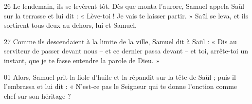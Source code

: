 
26 Le lendemain, ils se levèrent tôt. Dès que monta l’aurore, Samuel appela Saül sur la terrasse et lui dit : « Lève-toi ! Je vais te laisser partir. » Saül se leva, et ils sortirent tous deux au-dehors, lui et Samuel.

27 Comme ils descendaient à la limite de la ville, Samuel dit à Saül : « Dis au serviteur de passer devant nous – et ce dernier passa devant – et toi, arrête-toi un instant, que je te fasse entendre la parole de Dieu. »

01 Alors, Samuel prit la fiole d’huile et la répandit sur la tête de Saül ; puis il l’embrassa et lui dit : « N’est-ce pas le Seigneur qui te donne l’onction comme chef sur son héritage ?

